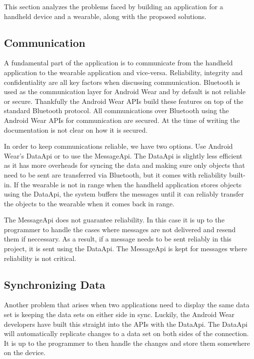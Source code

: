 This section analyzes the problems faced by building an application for a
handheld device and a wearable, along with the proposed solutions.

\subsection{Communication}

A fundamental part of the application is to communicate from the handheld
application to the wearable application and vice-versa. Reliability, integrity
and confidentiality are all key factors when discussing communication. Bluetooth
is used as the communication layer for Android Wear and by default is not
reliable or secure. Thankfully the Android Wear APIs build these features on top
of the standard Bluetooth protocol. All communications over Bluetooth using the
Android Wear APIs for communication are secured. At the time of writing the
documentation is not clear on how it is secured.

In order to keep communications reliable, we have two options. Use Android
Wear's DataApi or to use the MessageApi. The DataApi is slightly less efficient
as it has more overheads for syncing the data and making sure only objects that
need to be sent are transferred via Bluetooth, but it comes with reliability
built-in. If the wearable is not in range when the handheld application stores
objects using the DataApi, the system buffers the messages until it can reliably
transfer the objects to the wearable when it comes back in range.

The MessageApi does not guarantee reliability. In this case it is up to the
programmer to handle the cases where messages are not delivered and resend them
if neccessary. As a result, if a message needs to be sent reliably in this
project, it is sent using the DataApi. The MessageApi is kept for messages where
reliability is not critical.

\subsection{Synchronizing Data}

Another problem that arises when two applications need to display the same data
set is keeping the data sets on either side in sync. Luckily, the Android Wear
developers have built this straight into the APIs with the DataApi. The DataApi
will automatically replicate changes to a data set on both sides of the
connection. It is up to the programmer to then handle the changes and store
them somewhere on the device.

